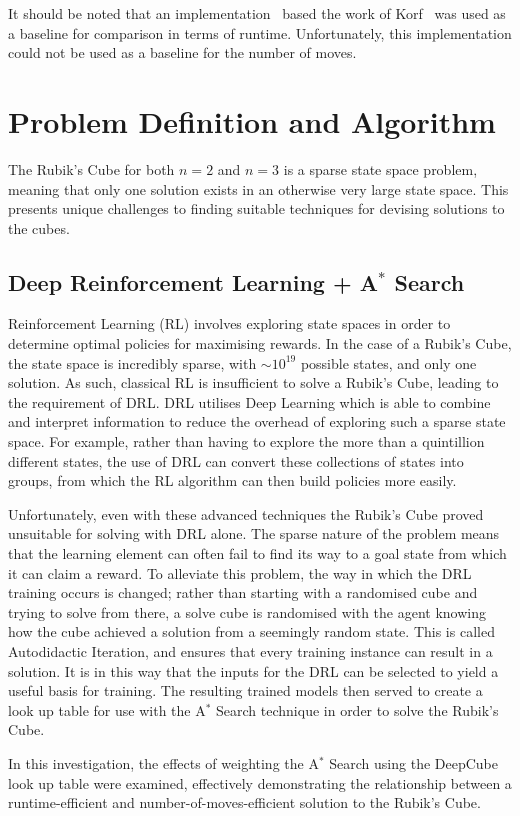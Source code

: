 \documentclass[UKenglish]{svproc}
\begin{document}
It should be noted that an implementation~\cite{Shoukat2019} based the work of Korf~\cite{KORF198597} was used as a baseline for comparison in terms of runtime. Unfortunately, this implementation could not be used as a baseline for the number of moves.


\section{Problem Definition and Algorithm}
The Rubik's Cube for both $n=2$ and $n=3$ is a sparse state space problem, meaning that only one solution exists in an otherwise very large state space. This presents unique challenges to finding suitable techniques for devising solutions to the cubes.

\subsection{Deep Reinforcement Learning + A$^{\ast}$ Search}
Reinforcement Learning (RL) involves exploring state spaces in order to determine optimal policies for maximising rewards. In the case of a Rubik's Cube, the state space is incredibly sparse, with $\sim 10^{19}$ possible states, and only one solution. As such, classical RL is insufficient to solve a Rubik's Cube, leading to the requirement of DRL. DRL utilises Deep Learning which is able to combine and interpret information to reduce the overhead of exploring such a sparse state space. For example, rather than having to explore the more than a quintillion different states, the use of DRL can convert these collections of states into groups, from which the RL algorithm can then build policies more easily. \par Unfortunately, even with these advanced techniques the Rubik's Cube proved unsuitable for solving with DRL alone. The sparse nature of the problem means that the learning element can often fail to find its way to a goal state from which it can claim a reward. To alleviate this problem, the way in which the DRL training occurs is changed; rather than starting with a randomised cube and trying to solve from there, a solve cube is randomised with the agent knowing how the cube achieved a solution from a seemingly random state. This is called Autodidactic Iteration, and ensures that every training instance can result in a solution. It is in this way that the inputs for the DRL can be selected to yield a useful basis for training. The resulting trained models then served to create a look up table for use with the A$^{\ast}$ Search technique in order to solve the Rubik's Cube. \par In this investigation, the effects of weighting the A$^{\ast}$ Search using the DeepCube look up table were examined, effectively demonstrating the relationship between a runtime-efficient and number-of-moves-efficient solution to the Rubik's Cube.
\end{document}
